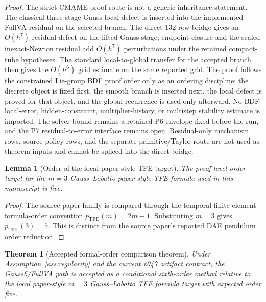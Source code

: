 \documentclass[11pt]{article}
\newtheorem{lemma}{Lemma}
\newtheorem{theorem}{Theorem}
\newcommand{\method}{Gauss6\slash FullVA}
\newcommand{\tfe}{TFE}
\begin{document}
\begin{proof}
The strict CMAME proof route is not a generic inheritance statement.  The
classical three-stage Gauss local defect is inserted into the implemented
FullVA residual on the selected branch.  The direct 132-row bridge gives an
\(O(h^7)\) residual defect on the lifted Gauss stage; endpoint closure and the
scaled inexact-Newton residual add \(O(h^7)\) perturbations under the retained
compact-tube hypotheses.  The standard local-to-global transfer for the
accepted branch then gives the \(O(h^6)\) grid estimate on the same reported
grid.  The proof follows the constrained Lie-group BDF proof order only as an
ordering discipline: the discrete object is fixed first, the smooth branch is
inserted next, the local defect is proved for that object, and the global
recurrence is used only afterward.  No BDF local-error, hidden-constraint,
multiplier-history, or multistep stability estimate is imported.  The solver
bound remains a retained P6 envelope fixed before the run,
and the P7 residual-to-error interface remains open.  Residual-only mechanism
rows, source-policy rows, and the separate primitive/Taylor route are not used
as theorem inputs and cannot be spliced into the direct bridge.
\end{proof}

\begin{lemma}[Order of the local paper-style \tfe{} target]
\label{lem:tfe-target-order}
The proof-level order target for the $m=3$ Gauss--Lobatto paper-style
\tfe{} formula used in this manuscript is five.
\end{lemma}

\begin{proof}
The source-paper family is compared through the temporal finite-element
formula-order convention $p_{\mathrm{TFE}}(m)=2m-1$.  Substituting $m=3$
gives $p_{\mathrm{TFE}}(3)=5$.  This is distinct from the source paper's
reported DAE pendulum order reduction.
\end{proof}

\begin{theorem}[Accepted formal-order comparison theorem]
\label{thm:formal-order}
Under Assumption~\ref{ass:regularity} and the current v047 artifact contract,
the \method{} path is accepted as a conditional sixth-order method relative
to the local paper-style $m=3$ Gauss--Lobatto \tfe{} formula target with
expected order five.
\end{theorem}
\end{document}
